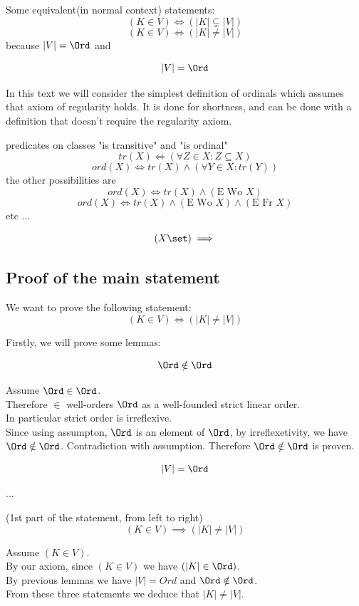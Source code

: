 Some equivalent(in normal context) statements:
\[
(K\in V)
\iff
(|K| \subsetneq |V|)
\]
\[
(K\in V)
\iff
(|K| \neq |V|)
\]
because $|V|=\Ord$ and
\begin{theorem}
\[
|V|=\Ord
\]
\end{theorem}
\Proof
\Done

In this text we will consider the simplest definition of ordinals which assumes that axiom of regularity holds. It is done for shortness, and can be done with a definition that doesn't require the regularity axiom.
\begin{definition} predicates on classes "is transitive" and "is ordinal"
\[
tr(X) \iff (\forall Z\in X: Z\subseteq X)
\]
\[
ord(X) \iff tr(X)\land (\forall Y\in X: tr(Y))
\]
the other possibilities are
\[
ord(X) \iff tr(X)\land (\mbox{E Wo }X)
\]
\[
ord(X) \iff tr(X)\land (\mbox{E Wo }X)\land (\mbox{E Fr }X)
\]
etc ...
\end{definition}
\[
(X \set)
\implies
\]

\subsection{Proof of the main statement}
We want to prove the following statement:
\[
(K \in V) \iff (|K| \neq |V|)
\]

Firstly, we will prove some lemmas:
\begin{lemma}
\[
\Ord\notin\Ord
\]
\end{lemma}
\Proof
Assume $\Ord\in\Ord$.\\
Therefore $\in$ well-orders $\Ord$ as a well-founded strict linear order.\\
In particular strict order is irreflexive.\\
Since using assumpton, $\Ord$ is an element of $\Ord$, by irreflexetivity, we have $\Ord\notin\Ord$.
Contradiction with assumption.
Therefore $\Ord\notin\Ord$ is proven.
\Done

\begin{lemma}
\[
|V|=\Ord
\]
\end{lemma}
\Proof
...\\
\Done

\begin{lemma}(1st part of the statement, from left to right)
\[
(K \in V) \implies (|K| \neq |V|)
\]
\end{lemma}
\Proof
Assume $(K \in V)$.\\
By our axiom, since $(K \in V)$ we have $(|K| \in \Ord)$.\\
By previous lemmas we have $|V|=Ord$ and $\Ord\notin\Ord$.\\
From these three statements we deduce that $|K| \neq |V|$.\\
\Done

